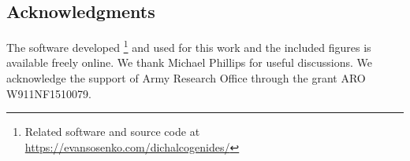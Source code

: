 \begin{acknowledgments}
  \section{Acknowledgments}

  The software developed
  \footnote{%
    Related software and source code at \\
    \url{https://evansosenko.com/dichalcogenides/}
  }
  and used
  \cite{Hunter:2007}
  for this work
  and the included figures is available freely online.
  We thank Michael Phillips for useful discussions.
  We acknowledge the support of Army Research Office through the grant
  ARO W911NF1510079.
\end{acknowledgments}
